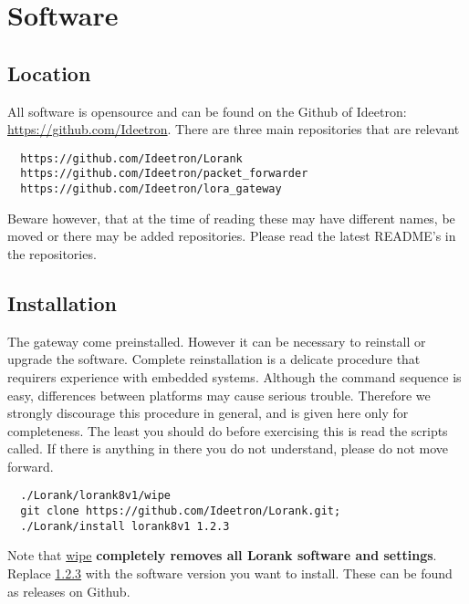 \documentclass[12pt]{article}
\begin{document}
\section{Software}

\subsection{Location}
All software is opensource and can be found on the Github of Ideetron:
\url{https://github.com/Ideetron}. There are three main repositories
that are relevant
\begin{verbatim}
  https://github.com/Ideetron/Lorank
  https://github.com/Ideetron/packet_forwarder
  https://github.com/Ideetron/lora_gateway
\end{verbatim}
Beware however, that at the time of reading these may have different names, be moved
or there may be added repositories. Please read the latest README's in the 
repositories. 

\subsection{Installation}
The gateway come preinstalled. However it can be necessary to reinstall or upgrade
the software. Complete reinstallation is a delicate procedure that requirers 
experience with embedded systems. Although the command sequence is easy, differences
between platforms may cause serious trouble. Therefore we strongly discourage this
procedure in general, and is given here only for completeness. The least you should
do before exercising this is read the scripts called. If there is anything in there
you do not understand, please do not move forward. 
\begin{verbatim}
  ./Lorank/lorank8v1/wipe   
  git clone https://github.com/Ideetron/Lorank.git; 
  ./Lorank/install lorank8v1 1.2.3
\end{verbatim}
Note that \url{wipe} {\bf completely removes all Lorank software and settings}.
Replace \url{1.2.3} with the software version you want to install. These can
be found as releases on Github.
\end{document}
